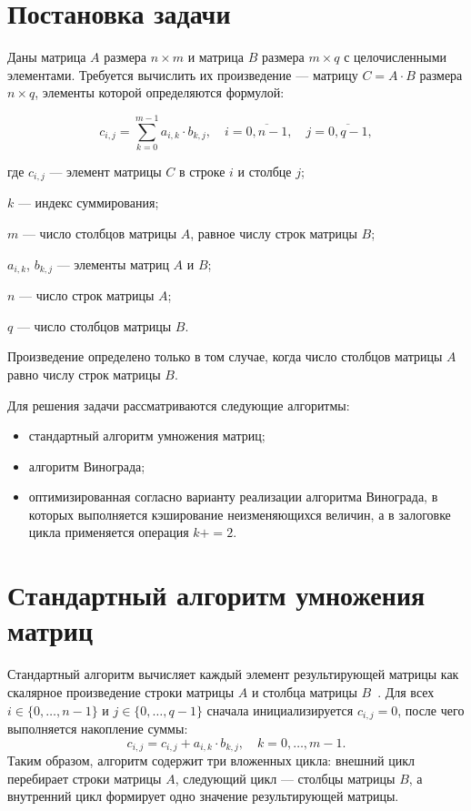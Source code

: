 \documentclass{bmstu}
\begin{document}
\section{Постановка задачи}
Даны матрица $A$ размера $n \times  m$ и матрица $B$ размера $m \times  q$ с
целочисленными элементами. Требуется вычислить их произведение —
матрицу $C = A \cdot  B$ размера $n \times  q$, элементы которой определяются
формулой:

\begin{equation}
	c_{i,j} = \sum_{k=0}^{m-1} a_{i,k} \cdot b_{k,j}, \quad i = \overline{0, n - 1}, \quad j = \overline{0, q - 1},
\end{equation}

где $c_{i,j}$ --- элемент матрицы $C$ в строке $i$ и столбце $j$;

$k$ --- индекс суммирования;

$m$ --- число столбцов матрицы $A$, равное числу строк матрицы $B$;

$a_{i,k}$, $b_{k,j}$ --- элементы матриц $A$ и $B$;

$n$ --- число строк матрицы $A$;

$q$ --- число столбцов матрицы $B$.

Произведение определено только в том случае, когда число столбцов матрицы $A$ равно числу строк матрицы $B$.

Для решения задачи рассматриваются следующие алгоритмы:
\begin{itemize}
	\item стандартный алгоритм умножения матриц;
	\item алгоритм Винограда;
	\item оптимизированная согласно варианту реализации алгоритма Винограда, в которых выполняется кэширование неизменяющихся величин, а в залоговке цикла применяется операция $k += 2$.
\end{itemize}

\section{Стандартный алгоритм умножения матриц}
Стандартный алгоритм вычисляет каждый элемент результирующей матрицы как
скалярное произведение строки матрицы $A$ и столбца матрицы $B$~\cite{anisimov2021matrix}. Для всех
$i \in \{0,\ldots,n-1\}$ и $j \in \{0,\ldots,q-1\}$ сначала
инициализируется $c_{i,j}=0$, после чего выполняется накопление суммы:
\begin{equation}
	c_{i,j} = c_{i,j} + a_{i,k} \cdot b_{k,j}, \quad
	k=0,\ldots,m-1.
\end{equation}
Таким образом, алгоритм содержит три вложенных цикла: внешний цикл перебирает
строки матрицы $A$, следующий цикл --- столбцы матрицы $B$, а внутренний цикл
формирует одно значение результирующей матрицы.
\end{document}
